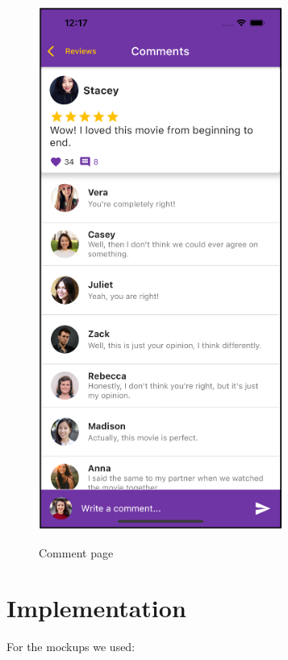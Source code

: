 \documentclass[12pt, a4paper]{article}
\numberwithin{figure}{section}
\begin{document}
\begin{center}
\begin{minipage}[t]{0.31\textwidth}
\begin{figure}[H]
			\includegraphics[width=0.71\textwidth]{images/final/comment.png}\\
			\caption{Comment page}
		\end{figure}
	\end{minipage}
\end{center}


\newpage

\section{Implementation}

For the mockups we used:
\end{document}
